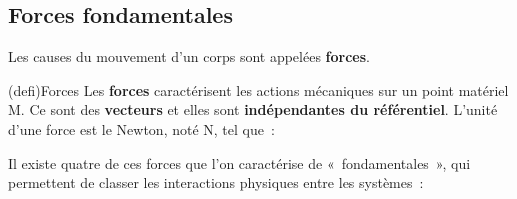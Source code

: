 \documentclass[../../main/main.tex]{subfiles}
\begin{document}
\subsection{Forces fondamentales}
Les causes du mouvement d'un corps sont appelées \textbf{forces}.
\begin{tcb*}[sidebyside](defi){Forces}
	Les \textbf{forces} caractérisent les actions mécaniques sur un point matériel
	M. Ce sont des \textbf{vecteurs} et elles sont \textbf{indépendantes du
		référentiel}.
	\tcblower
	L'unité d'une force est le Newton, noté N, tel que~:
	\psw{
		\[\boxed{\SI{1}{N} = \SI{1}{kg.m.s^{-2}}}\]
	}
\end{tcb*}
Il existe quatre de ces forces que l'on caractérise de «~fondamentales~», qui
permettent de classer les interactions physiques entre les systèmes~:
\end{document}
